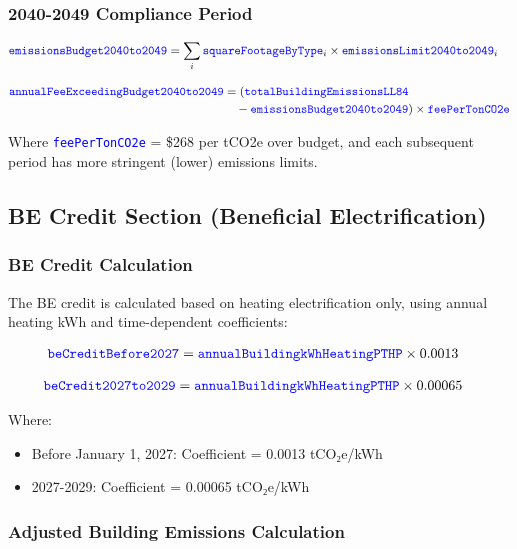 \documentclass{article}
\newcommand{\code}[1]{\textcolor{blue}{\texttt{#1}}}
\begin{document}
\subsubsection{2040-2049 Compliance Period}
\begin{align}
\code{emissionsBudget2040to2049} &= \sum_{i} \code{squareFootageByType}_i \times \code{emissionsLimit2040to2049}_i
\end{align}

\begin{align}
\code{annualFeeExceedingBudget2040to2049} &= (\code{totalBuildingEmissionsLL84} \nonumber\\
&\quad - \code{emissionsBudget2040to2049}) \times \code{feePerTonCO2e}
\end{align}

Where \code{feePerTonCO2e} = \$268 per tCO2e over budget, and each subsequent period has more stringent (lower) emissions limits.

\subsection{BE Credit Section (Beneficial Electrification)}

\subsubsection{BE Credit Calculation}

The BE credit is calculated based on heating electrification only, using annual heating kWh and time-dependent coefficients:

\begin{align}
\code{beCreditBefore2027} &= \code{annualBuildingkWhHeatingPTHP} \times 0.0013
\end{align}

\begin{align}
\code{beCredit2027to2029} &= \code{annualBuildingkWhHeatingPTHP} \times 0.00065
\end{align}

Where:
\begin{itemize}
    \item Before January 1, 2027: Coefficient = 0.0013 tCO₂e/kWh
    \item 2027-2029: Coefficient = 0.00065 tCO₂e/kWh
\end{itemize}

\subsubsection{Adjusted Building Emissions Calculation}
\end{document}

